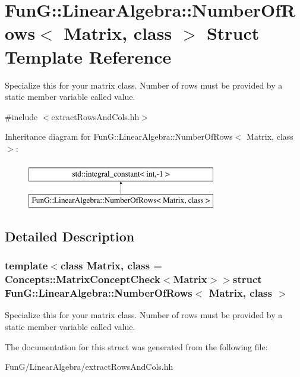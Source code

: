\hypertarget{structFunG_1_1LinearAlgebra_1_1NumberOfRows}{\section{Fun\-G\-:\-:Linear\-Algebra\-:\-:Number\-Of\-Rows$<$ Matrix, class $>$ Struct Template Reference}
\label{structFunG_1_1LinearAlgebra_1_1NumberOfRows}
}


Specialize this for your matrix class. Number of rows must be provided by a static member variable called value.  




{\ttfamily \#include $<$extract\-Rows\-And\-Cols.\-hh$>$}

Inheritance diagram for Fun\-G\-:\-:Linear\-Algebra\-:\-:Number\-Of\-Rows$<$ Matrix, class $>$\-:\begin{figure}[H]
\begin{center}
\leavevmode
\includegraphics[height=2.000000cm]{structFunG_1_1LinearAlgebra_1_1NumberOfRows}
\end{center}
\end{figure}


\subsection{Detailed Description}
\subsubsection*{template$<$class Matrix, class = Concepts\-::\-Matrix\-Concept\-Check$<$\-Matrix$>$$>$struct Fun\-G\-::\-Linear\-Algebra\-::\-Number\-Of\-Rows$<$ Matrix, class $>$}

Specialize this for your matrix class. Number of rows must be provided by a static member variable called value. 

The documentation for this struct was generated from the following file\-:\begin{DoxyCompactItemize}
\item 
Fun\-G/\-Linear\-Algebra/extract\-Rows\-And\-Cols.\-hh\end{DoxyCompactItemize}
